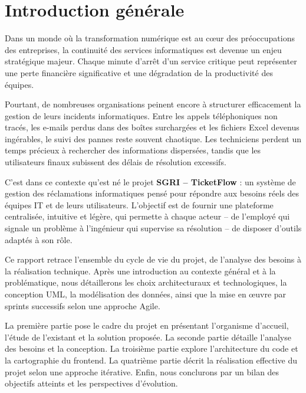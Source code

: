 \documentclass[12pt,a4paper,twoside]{report}
\begin{document}
\tableofcontents

\chapter*{Introduction générale}

\vspace*{1cm}

Dans un monde où la transformation numérique est au cœur des préoccupations des entreprises, la continuité des services informatiques est devenue un enjeu stratégique majeur. Chaque minute d'arrêt d'un service critique peut représenter une perte financière significative et une dégradation de la productivité des équipes.

Pourtant, de nombreuses organisations peinent encore à structurer efficacement la gestion de leurs incidents informatiques. Entre les appels téléphoniques non tracés, les e-mails perdus dans des boîtes surchargées et les fichiers Excel devenus ingérables, le suivi des pannes reste souvent chaotique. Les techniciens perdent un temps précieux à rechercher des informations dispersées, tandis que les utilisateurs finaux subissent des délais de résolution excessifs.

C'est dans ce contexte qu'est né le projet \textbf{SGRI -- TicketFlow} : un système de gestion des réclamations informatiques pensé pour répondre aux besoins réels des équipes IT et de leurs utilisateurs. L'objectif est de fournir une plateforme centralisée, intuitive et légère, qui permette à chaque acteur -- de l'employé qui signale un problème à l'ingénieur qui supervise sa résolution -- de disposer d'outils adaptés à son rôle.

Ce rapport retrace l'ensemble du cycle de vie du projet, de l'analyse des besoins à la réalisation technique. Après une introduction au contexte général et à la problématique, nous détaillerons les choix architecturaux et technologiques, la conception UML, la modélisation des données, ainsi que la mise en œuvre par sprints successifs selon une approche Agile.

La première partie pose le cadre du projet en présentant l'organisme d'accueil, l'étude de l'existant et la solution proposée. La seconde partie détaille l'analyse des besoins et la conception. La troisième partie explore l'architecture du code et la cartographie du frontend. La quatrième partie décrit la réalisation effective du projet selon une approche itérative. Enfin, nous conclurons par un bilan des objectifs atteints et les perspectives d'évolution.
\end{document}
